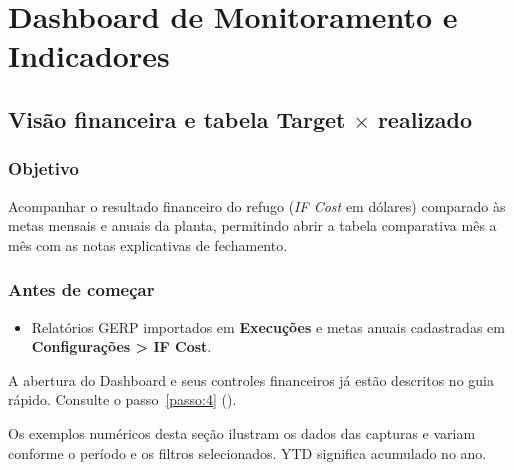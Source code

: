 \chapter{Dashboard de Monitoramento e Indicadores}

\label{cap:manual-5}

\section{Visão financeira e tabela Target \ensuremath{\times} realizado}

\subsection*{Objetivo}

Acompanhar o resultado financeiro do refugo (\emph{IF Cost} em dólares) comparado às metas mensais e anuais da planta, permitindo abrir a tabela comparativa mês a mês com as notas explicativas de fechamento.\par

\subsection*{Antes de começar}

\begin{itemize}
\item Relatórios GERP importados em \textbf{Execuções} e metas anuais cadastradas em \textbf{Configurações > IF Cost}.
\end{itemize}

\begin{remark}[info]
A abertura do Dashboard e seus controles financeiros já estão descritos no guia rápido. Consulte o passo~\ref{passo:4} ().
\end{remark}
Os exemplos numéricos desta seção ilustram os dados das capturas e variam conforme o período e os filtros selecionados. YTD significa acumulado no ano.

\Needspace{190pt}
